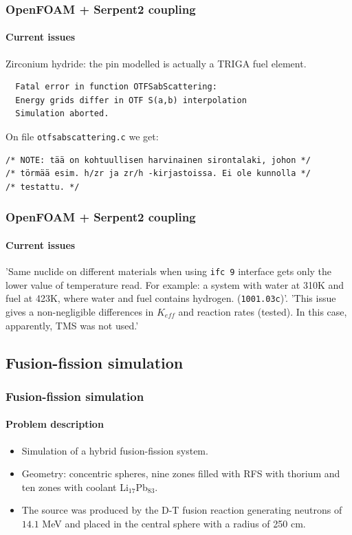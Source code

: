 \documentclass[svgnames,smaller,table,draft]{beamer}
\begin{document}
\begin{frame}[fragile] %
  \frametitle{OpenFOAM + Serpent2 coupling}
  \framesubtitle{Current issues}
  \begin{center}
  Zirconium hydride: the pin modelled is actually a TRIGA fuel element.\\
\begin{verbatim}
  Fatal error in function OTFSabScattering:
  Energy grids differ in OTF S(a,b) interpolation
  Simulation aborted.
\end{verbatim}

On file \texttt{otfsabscattering.c} we get:

\begin{verbatim}
/* NOTE: tää on kohtuullisen harvinainen sirontalaki, johon */
/* törmää esim. h/zr ja zr/h -kirjastoissa. Ei ole kunnolla */
/* testattu. */
\end{verbatim}
  
  \end{center}
\end{frame}

\begin{frame}[fragile] %
  \frametitle{OpenFOAM + Serpent2 coupling}
  \framesubtitle{Current issues}  
  'Same nuclide on different materials when using \texttt{ifc 9} interface gets only the lower value
  of temperature read. For example: a system with water at 310K and fuel at 423K, where water and fuel
  contains hydrogen. (\texttt{1001.03c})'.
  \vspace{10px}
  'This issue gives a non-negligible differences in $K_{eff}$ and reaction rates (tested). In this case,
  apparently, TMS was not used.'
\end{frame}



\subsection{Fusion-fission simulation}

\begin{frame}
  \frametitle{Fusion-fission simulation}
  \framesubtitle{Problem description}
  \begin{itemize}
  \item Simulation of a hybrid fusion-fission system.
  \item Geometry: concentric spheres, nine zones filled with RFS with thorium and ten zones with coolant Li$_{17}$Pb$_{83}$.
  \item The source was produced by the D-T fusion reaction generating neutrons of $14.1$ MeV and placed in the central sphere with a radius of 250 cm.
  \end{itemize}
\end{frame}
\end{document}

